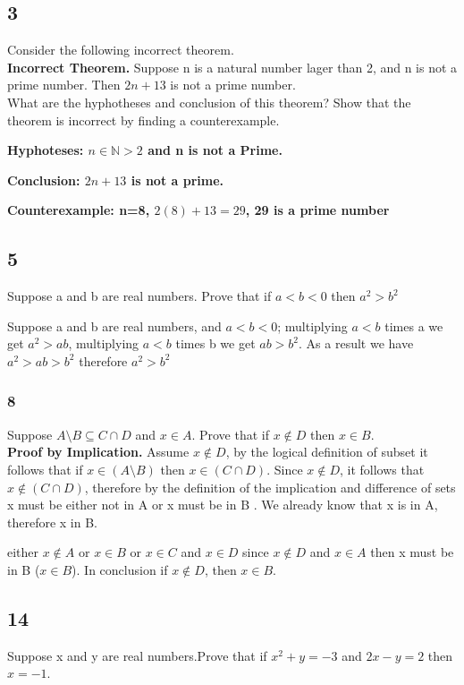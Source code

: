 \documentclass{article}
\begin{document}
\subsection{3}
Consider the following incorrect theorem. 
\\
\textbf{Incorrect Theorem.} Suppose n is a natural number lager than 2, and n is not a prime number. Then $2n + 13$ is not a prime number.
\\
What are the hyphotheses and conclusion of this theorem? Show that the theorem is incorrect by finding a counterexample.

\textbf{Hyphoteses: $n \in \mathbb{N} > 2$ and n is not a Prime.}

\textbf{Conclusion: $2n + 13$ is not a prime.}

\textbf{Counterexample: n=8, $2(8)+13 = 29$, 29 is a prime number}
\subsection{5}
Suppose a and b are real numbers. Prove that if $a < b < 0$ then $ a^2 > b^2$

Suppose a and b are real numbers, and $a < b< 0$; multiplying $a<b$ times a  we get $a^2> ab$, multiplying $a <b$ times b we get $ab>b^2$. As a result we have $a^2> ab >b^2$ therefore $a^2 > b^2$


\subsubsection{8}
Suppose $A \setminus B \subseteq C \cap D$ and $x \in A$. Prove that if $x \notin D$ then $x \in B$.
\\
\textbf{Proof by Implication.} Assume $x \notin D$, by the logical definition of subset it follows that if $x \in (A \setminus B)$ then $x \in (C \cap D)$. Since  $x \notin D$, it follows that $x \notin(C \cap D)$, therefore  by the definition of the implication and difference of sets x must be either not in A or x must be in B . We already know that x is in A, therefore  x in B.



either  $x \notin A$ or $ x \in B$ or $x \in C$ and $x \in D$ since $x\notin D$ and $x \in A$ then x must be in B ($x \in B$). In conclusion if $x \notin D$, then $x \in B$.

\subsection{14}
Suppose x and y are real numbers.Prove that if $x^2 + y = -3 $ and $2x -y = 2$ then $x = -1$.
\end{document}
